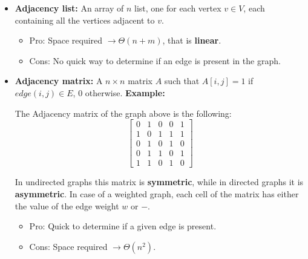 \begin{itemize}
    \item \textbf{Adjacency list:} An array of $n$ list, one for each vertex $v \in V$, each containing all the vertices adjacent to $v$.
    \begin{itemize}
        \item Pro: Space required $\rightarrow \Theta(n + m)$, that is \textbf{linear}.
        
        \item Cons: No quick way to determine if an edge is present in the graph.
    \end{itemize}

    \item \textbf{Adjacency matrix:} A $n \times n$ matrix $A$ such that $A[i,j] = 1$ if $edge(i,j) \in E$, 0 otherwise.\newline\newline
    \textbf{Example:}\newline\newline
    \begin{center}
    \end{center}
    The Adjacency matrix of the graph above is the following:
    \[\begin{bmatrix}
        0 & 1 & 0 & 0 & 1 \\
        1 & 0 & 1 & 1 & 1 \\
        0 & 1 & 0 & 1 & 0 \\
        0 & 1 & 1 & 0 & 1 \\
        1 & 1 & 0 & 1 & 0
    \end{bmatrix}\]

    In undirected graphs this matrix is \textbf{symmetric}, while in directed graphs it is \textbf{asymmetric}. In case of a weighted graph, each cell of the matrix has either the value of the edge weight $w$ or $-$.
    \begin{itemize}
        \item Pro: Quick to determine if a given edge is present.
        \item Cons: Space required $\rightarrow \Theta(n^{2})$.
    \end{itemize}
\end{itemize}


